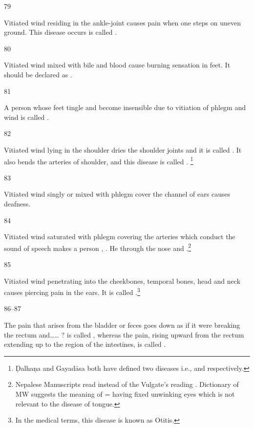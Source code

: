 \begin{translation}
\item[79]

	Vitiated wind residing in the ankle-joint causes pain when one steps on
	uneven ground. This disease occurs is called .

\item[80]

	Vitiated wind mixed with bile and blood cause burning sensation in feet.
	It should be declared as .

\item[81]

	A person whose feet tingle and become insensible due to vitiation of
	phlegm and wind is called .

\item[82]

	Vitiated wind lying in the shoulder dries the shoulder joints and it is
	called . It also bends the arteries of shoulder, and this
	disease is called . \footnote{Ḍalhaṇa and Gayadāsa both have
	defined two diseases i.e.,  and  respectively.}

\item[83]

	Vitiated wind singly or mixed with phlegm cover the channel of ears
	causes deafness.

\item[84]

	Vitiated wind saturated with phlegm covering the arteries which conduct
	the sound of speech makes a person ,
	. He  through the nose and
	.\footnote{Nepalese Manuscripts read 
	instead of the Vulgate’s reading . Dictionary of MW suggests
	the meaning of  = having fixed unwinking eyes which is not
	relevant to the disease of tongue.}

\item[85]

	Vitiated wind penetrating into the cheekbones, temporal bones, head and
	neck causes piercing pain in the ears. It is called
	.\footnote{In the medical terms, this disease is
	known as Otitis.}

\item[86--87]

	The pain that arises from the bladder or feces goes down as if it were
	breaking the rectum and…… ? is called , whereas the pain,
	rising upward from the rectum extending up to the region of the
	intestines, is called .


\end{translation}
